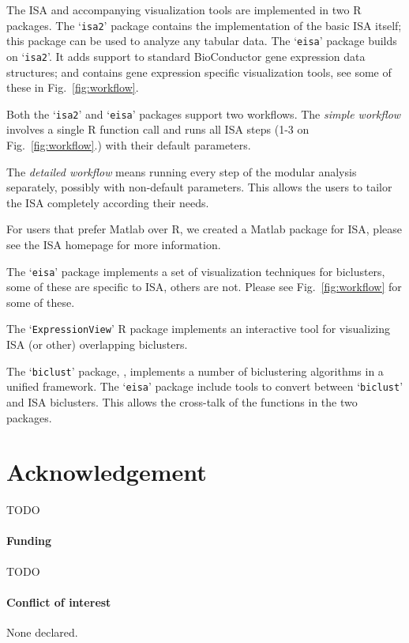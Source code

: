 \documentclass{bioinfo}
\newcommand{\Rpackage}[1]{`\texttt{#1}'}
\begin{document}
The ISA and accompanying visualization tools are implemented in two R
packages. The \Rpackage{isa2} package contains the implementation of
the basic ISA itself; this package can be used to analyze any tabular
data. The \Rpackage{eisa} package builds on \Rpackage{isa2}. It adds
support to standard BioConductor gene expression data structures; and
contains gene expression specific visualization tools, see some of
these in Fig.~\ref{fig:workflow}.

Both the \Rpackage{isa2} and \Rpackage{eisa} packages support two
workflows. The \emph{simple workflow} involves a single R function
call and runs all ISA steps (1-3 on Fig.~\ref{fig:workflow}.) with
their default parameters.

The \emph{detailed workflow} means running every step of the modular
analysis separately, possibly with non-default parameters. This allows
the users to tailor the ISA completely according their needs.

For users that prefer Matlab over R, we created a Matlab package for
ISA, please see the ISA homepage for more information.


The \Rpackage{eisa} package implements a set of visualization
techniques for biclusters, some of these are specific to ISA, others
are not. Please see Fig.~\ref{fig:workflow} for some of these.

The \Rpackage{ExpressionView} R package implements an interactive tool
for visualizing ISA (or other) overlapping biclusters.


The \Rpackage{biclust} package, \cite{biclust}, implements a number of
biclustering algorithms in a unified framework. The \Rpackage{eisa}
package include tools to convert between \Rpackage{biclust} and ISA
biclusters. This allows the cross-talk of the functions in the two
packages.

\section*{Acknowledgement}

TODO

\paragraph{Funding\textcolon} TODO

\paragraph{Conflict of interest\textcolon} None declared.



\end{document}
